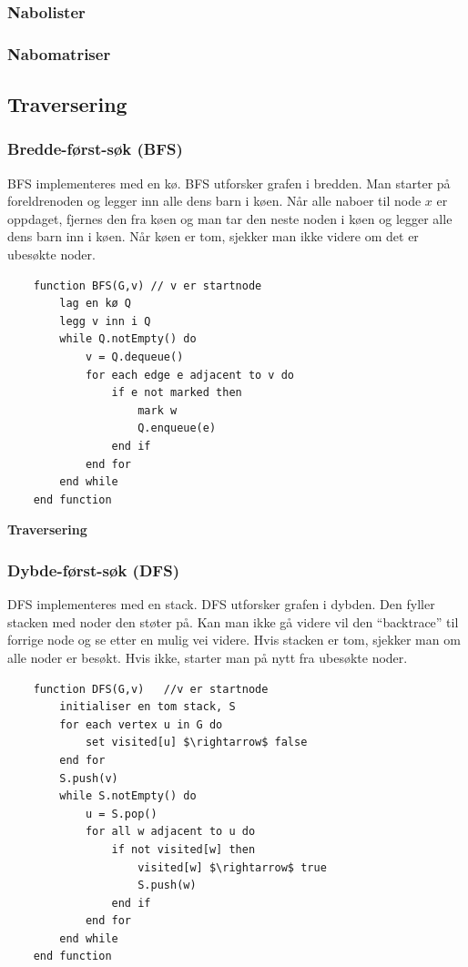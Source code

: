 \subsubsection{Nabolister}
\subsubsection{Nabomatriser}
\subsection{Traversering}
\subsubsection{Bredde-først-søk (BFS)}
BFS implementeres med en kø. BFS utforsker grafen i bredden. Man starter på foreldrenoden og legger inn alle dens barn i køen. Når alle naboer til node $x$ er oppdaget, fjernes den fra køen og man tar den neste noden i køen og legger alle dens barn inn i køen. Når køen er tom, sjekker man ikke videre om det er ubesøkte noder.

\begin{lstlisting}
    function BFS(G,v) // v er startnode
	    lag en kø Q
    	legg v inn i Q
    	while Q.notEmpty() do
    		v = Q.dequeue()
    		for each edge e adjacent to v do
    			if e not marked then
    				mark w
    				Q.enqueue(e)
    			end if
    		end for
    	end while
    end function

\end{lstlisting}


\noindent \textbf{Traversering}

\subsubsection{Dybde-først-søk (DFS)}
DFS implementeres med en stack. DFS utforsker grafen i dybden. Den fyller stacken med noder den støter på. Kan man ikke gå videre vil den “backtrace” til forrige node og se etter en mulig vei videre. Hvis stacken er tom, sjekker man om alle noder er besøkt. Hvis ikke, starter man på nytt fra ubesøkte noder.

\begin{lstlisting}
    function DFS(G,v)	//v er startnode
	    initialiser en tom stack, S
    	for each vertex u in G do
    		set visited[u] $\rightarrow$ false
    	end for
    	S.push(v)
    	while S.notEmpty() do
    		u = S.pop()
    		for all w adjacent to u do
    			if not visited[w] then
    				visited[w] $\rightarrow$ true
    				S.push(w)
    			end if
    		end for
    	end while
    end function
\end{lstlisting}

